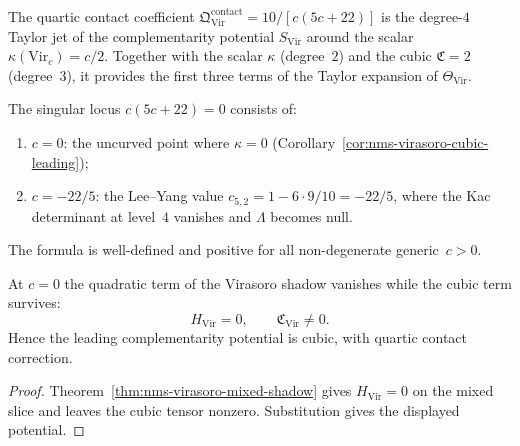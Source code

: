 \begin{remark}
\label{rem:quartic-theta-significance}
The quartic contact coefficient
$\mathfrak Q^{\mathrm{contact}}_{\mathrm{Vir}} = 10/[c(5c+22)]$
is the degree-$4$ Taylor jet of the complementarity potential
$S_{\mathrm{Vir}}$ around the scalar $\kappa(\mathrm{Vir}_c) = c/2$.
Together with the scalar $\kappa$ (degree~$2$) and the cubic
$\mathfrak C = 2$ (degree~$3$), it provides the first three terms of
the Taylor expansion of $\Theta_{\mathrm{Vir}}$.

The singular locus $c(5c+22) = 0$ consists of:
\begin{enumerate}[label=\textup{(\alph*)}]
\item $c = 0$: the uncurved point where
 $\kappa = 0$ (Corollary~\textup{\ref{cor:nms-virasoro-cubic-leading}});
\item $c = -22/5$: the Lee--Yang value
 $c_{5,2} = 1 - 6 \cdot 9/10 = -22/5$, where the Kac determinant
 at level~$4$ vanishes and $\Lambda$ becomes null.
\end{enumerate}
The formula is well-defined and positive for all non-degenerate
generic~$c > 0$.
\end{remark}

\begin{corollary}
\label{cor:nms-virasoro-cubic-leading}
At $c=0$ the quadratic term of the Virasoro shadow vanishes while the cubic term survives:
\[
H_{\mathrm{Vir}}=0,
\qquad
\mathfrak C_{\mathrm{Vir}}\neq 0.
\]
Hence the leading complementarity potential is cubic, with quartic contact correction.
\end{corollary}

\begin{proof}
Theorem~\ref{thm:nms-virasoro-mixed-shadow} gives
$H_{\mathrm{Vir}}=0$ on the mixed slice and leaves the cubic tensor
nonzero. Substitution gives the displayed potential.\qedhere
\end{proof}

